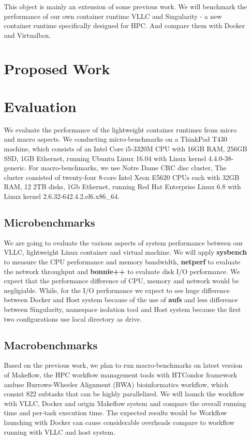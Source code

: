 \documentclass{article}
\begin{document}
This object is mainly an extension of some previous work. We will benchmark the performance of our
own container runtime VLLC and Singularity - a new container runtime specifically designed for HPC.
And compare them with Docker and Virtualbox.

\section{Proposed Work}

\section{Evaluation}

We evaluate the performance of the lightweight container runtimes from micro and macro aspects. We conducting 
micro-benchmarks on a ThinkPad T430 machine, which consists of an Intel Core i5-3320M CPU with 16GB RAM, 256GB
SSD, 1GB Ethernet, running Ubuntu Linux 16.04 with Linux kernel 4.4.0-38-generic. For macro-benchmarks, we use
Notre Dame CRC disc cluster, The cluster consisted of twenty-four 8-core Intel Xeon E5620 CPUs each with 32GB
RAM, 12 2TB disks, 1Gb Ethernet, running Red Hat Enterprise Linux 6.8 with Linux kernel 2.6.32-642.4.2.el6.x86\_64.

\subsection{Microbenchmarks}

We are going to evaluate the various aspects of system performance between our VLLC, 
lightweight Linux container and virtual machine. We will apply \textbf{sysbench} to measure the CPU 
performance and memory bandwidth, \textbf{netperf} to evaluate the network throughput and \textbf{bonnie++} 
to evaluate disk I/O performance. We expect that the performance difference of CPU, memory and network would 
be negligiable. While, for the I/O performance we expect to see huge difference between Docker and Host 
system because of the use of \textbf{aufs} and less difference between Singularity, namespace isolation tool and
Host system because the first two configurations use local directory as drive.

\subsection{Macrobenchmarks}

Based on the previous work\cite{zheng2015integrating}, we plan to run macro-benchmarks on latest version of Makeflow, 
the HPC workflow management tools with HTCondor framework anduse Burrows-Wheeler Alignment (BWA) 
bioinformatics workflow, which consist 822 subtasks that can be highly parallelized. We will launch 
the workflow with VLLC, Docker and origin Makeflow system and compare the overall running time and per-task execution time.
The expected results would be Workflow launching with Docker can cause considerable overheads compare to workflow
running with VLLC and host system.
\end{document}
